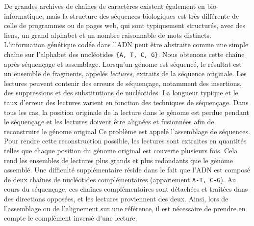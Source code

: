De grandes archives de chaînes de caractères existent également en bio-informatique, mais la structure des séquences biologiques est très différente de celle de programmes ou de pages web, qui sont typiquement structurés, avec des liens, un grand alphabet et un nombre raisonnable de mots distincts.
L'information génétique codée dans l'ADN peut être abstraite comme une simple chaîne sur l'alphabet des nucléotides \texttt{\{A, T, C, G\}}.
Nous obtenons cette chaîne après séquençage et assemblage. Lorsqu'un génome est séquencé, le résultat est un ensemble de fragments, appelés \emph{lectures}, extraits de la séquence originale. Les lectures peuvent contenir des erreurs de séquençage, notamment des insertions, des suppressions et des substitutions de nucléotides. La longueur typique et le taux d'erreur des lectures varient en fonction des techniques de séquençage.
%
Dans tous les cas, la position originale de la lecture dans le génome est perdue pendant le séquençage et les lectures doivent être alignées et fusionnées afin de reconstruire le génome original Ce problème est appelé l'assemblage de séquences. Pour rendre cette reconstruction possible, les lectures sont extraites en quantités telles que chaque position du génome original est couverte plusieurs fois. Cela rend les ensembles de lectures plus grands et plus redondants que le génome assemblé. 
Une difficulté supplémentaire réside dans le fait que l'ADN est composé de deux chaînes de nucléotides complémentaires (appariement \texttt{A-T, C-G}). Au cours du séquençage, ces chaînes complémentaires sont détachées et traitées dans des directions opposées, et les lectures proviennent des deux. Ainsi, lors de l'assemblage ou de l'alignement sur une référence, il est nécessaire de prendre en compte le complément inversé d'une lecture.


